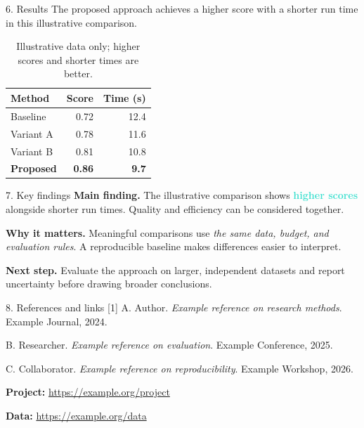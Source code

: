 \documentclass[11pt]{beamer}
\begin{document}
\begin{frame}[fragile,t]
  \begin{colorblock}{6. Results}
    The proposed approach achieves a higher score with a shorter run
    time in this illustrative comparison.
    \begin{table}
      \centering
      \begin{tabular}{@{}lrr@{}}
        \toprule
        \textbf{Method} & \textbf{Score} & \textbf{Time (s)} \\
        \midrule
        Baseline & 0.72 & 12.4 \\
        Variant A & 0.78 & 11.6 \\
        Variant B & 0.81 & 10.8 \\
        \textbf{Proposed} & \textbf{0.86} & \textbf{9.7} \\
        \bottomrule
      \end{tabular}
      \caption{Illustrative data only; higher scores and shorter times are better.}
    \end{table}
  \end{colorblock}

  \begin{colorblock}{7. Key findings}
    \textbf{Main finding.} The illustrative comparison shows
    \textcolor{turquoise}{\textbf{higher scores}} alongside shorter run
    times. Quality and efficiency can be considered together.
    \par\medskip
    \textbf{Why it matters.} Meaningful comparisons use
    \emph{the same data, budget, and evaluation rules}. A reproducible
    baseline makes differences easier to interpret.
    \par\medskip
    \textbf{Next step.} Evaluate the approach on
    \alert{larger, independent datasets} and report uncertainty
    before drawing broader conclusions.
  \end{colorblock}

  \begin{colorblock}{8. References and links}
    [1] A. Author. \emph{Example reference on research methods}.
    Example Journal, 2024.
    \par\medskip
    [2] B. Researcher. \emph{Example reference on evaluation}.
    Example Conference, 2025.
    \par\medskip
    [3] C. Collaborator. \emph{Example reference on reproducibility}.
    Example Workshop, 2026.
    \par\bigskip
    \textbf{Project:} \url{https://example.org/project}
    \par\medskip
    \textbf{Data:} \url{https://example.org/data}
  \end{colorblock}
\end{frame}
\end{document}
